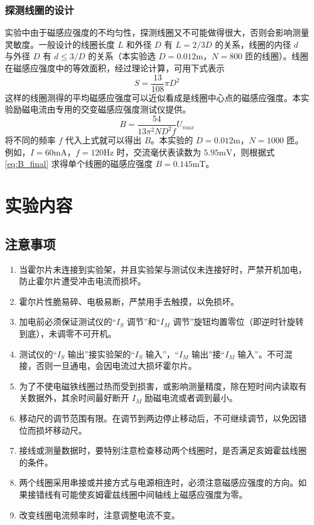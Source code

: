 \documentclass[11pt]{article}
\begin{document}
\subsubsection{探测线圈的设计}

实验中由于磁感应强度的不均匀性，探测线圈又不可能做得很大，否则会影响测量灵敏度。一般设计的线圈长度 $L$ 和外径 $D$ 有 $L=2/3 D$ 的关系，线圈的内径 $d$ 与外径 $D$ 有 $d \le 3/D$ 的关系（本实验选 $D=0.012\text{m}$，$N=800$ 匝的线圈）。线圈在磁感应强度中的等效面积，经过理论计算，可用下式表示
\begin{equation}
    S = \frac{13}{108} \pi D^2 \label{eq:coil_area}
\end{equation}
这样的线圈测得的平均磁感应强度可以近似看成是线圈中心点的磁感应强度。本实验励磁电流由专用的交变磁感应强度测试仪提供。
\begin{equation}
    B = \frac{54}{13 \pi^2 N D^2 f} U_{max} \label{eq:B_final}
\end{equation}
将不同的频率 $f$ 代入上式就可以得出 $B$。本实验的 $D=0.012\text{m}$，$N=1000$ 匝。
例如，$I=60\text{mA}$，$f=120\text{Hz}$ 时，交流毫伏表读数为 $5.95\text{mV}$，则根据式 \eqref{eq:B_final} 求得单个线圈的磁感应强度 $B=0.145\text{mT}$。

\section{实验内容}

\subsection{注意事项}

\begin{enumerate}
    \item 当霍尔片未连接到实验架，并且实验架与测试仪未连接好时，严禁开机加电，防止霍尔片遭受冲击电流而损坏。
    \item 霍尔片性脆易碎、电极易断，严禁用手去触摸，以免损坏。
    \item 加电前必须保证测试仪的“$I_S$ 调节”和“$I_M$ 调节”旋钮均置零位（即逆时针旋转到底），未调零不可开机。
    \item 测试仪的“$I_S$ 输出”接实验架的“$I_S$ 输入”，“$I_M$ 输出”接“$I_M$ 输入”。不可混接，否则一旦通电，会因电流过大损坏霍尔片。
    \item 为了不使电磁铁线圈过热而受到损害，或影响测量精度，除在短时间内读取有关数据外，其余时间最好断开 $I_M$ 励磁电流或者调到最小。
    \item 移动尺的调节范围有限。在调节到两边停止移动后，不可继续调节，以免因错位而损坏移动尺。
    \item 接线或测量数据时，要特别注意检查移动两个线圈时，是否满足亥姆霍兹线圈的条件。
    \item 两个线圈采用串接或并接方式与电源相连时，必须注意磁感应强度的方向。如果接错线有可能使亥姆霍兹线圈中间轴线上磁感应强度为零。
    \item 改变线圈电流频率时，注意调整电流不变。
\end{enumerate}
\end{document}
